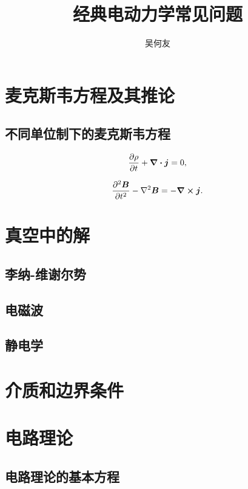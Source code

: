 \documentclass[UTF8, a4paper]{ctexart}
\title{经典电动力学常见问题}
\author{吴何友}
\begin{document}
\maketitle

\section{麦克斯韦方程及其推论}

\subsection{不同单位制下的麦克斯韦方程}

\begin{equation}
    \pdv{\rho}{t} + \div{\vb*{j}} = 0,
    \label{eq:charge-transportation}
\end{equation}

\begin{equation}
    \pdv[2]{\vb*{B}}{t} - \laplacian{\vb*{B}} = - \curl{\vb*{j}}.
\end{equation}

\section{真空中的解}

\subsection{李纳-维谢尔势}

\subsection{电磁波}

\subsection{静电学}

\section{介质和边界条件}

\section{电路理论}

\subsection{电路理论的基本方程}
\end{document}
